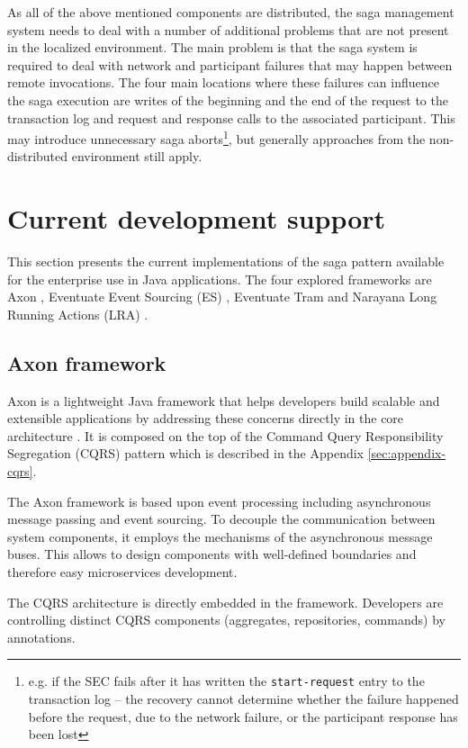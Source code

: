\documentclass[oneside,
  digital, %
  table,   %
  lof,     %
  lot,     %
]{fithesis3}
\begin{document}
As all of the above mentioned components are distributed, the saga management system needs to deal with a number of additional problems that are not present in the localized environment. The main problem is that the saga system is required to deal with network and participant failures that may happen between remote invocations. The four main locations where these failures can influence the saga execution are writes of the beginning and the end of the request to the transaction log and request and response calls to the associated participant. This may introduce unnecessary saga aborts\footnote{e.g. if the SEC fails after it has written the \texttt{start-request} entry to the transaction log -- the recovery cannot determine whether the failure happened before the request, due to the network failure, or the participant response has been lost}, but generally approaches from the non-distributed environment still apply.

\section{Current development support}

This section presents the current implementations of the saga pattern available for the enterprise use in Java applications. The four explored frameworks are Axon \cite{axon_framework}, Eventuate Event Sourcing (ES) \cite{eventuate.io}, Eventuate Tram \cite{eventuate-tram} and Narayana Long Running Actions (LRA) \cite{narayana_lra}.

\subsection{Axon framework}

Axon is a lightweight Java framework that helps developers build scalable and extensible applications by addressing these concerns directly in the core architecture \cite{axon_framework}. It is composed on the top of the Command Query Responsibility Segregation (CQRS) pattern which is described in the Appendix \ref{sec:appendix-cqrs}.

The Axon framework is based upon event processing including asynchronous message passing and event sourcing. To decouple the communication between system components, it employs the mechanisms of the asynchronous message buses. This allows to design components with well-defined boundaries and therefore easy microservices development.

The CQRS architecture is directly embedded in the framework. Developers are controlling distinct CQRS components (aggregates, repositories, commands) by annotations. 
\end{document}
